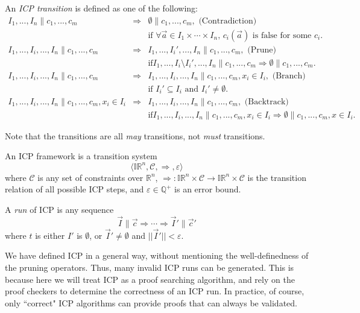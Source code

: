\documentclass[envcountsect]{llncs}
\begin{document}
\begin{definition}
An {\em ICP transition} is defined as one of the following:
\begin{eqnarray*}
I_1,...,I_n \parallel c_1, ..., c_m &\Longrightarrow&  \emptyset\parallel
c_1,...,c_m,
\mbox{ (Contradiction) }\\ & &\mbox{if $\forall \vec a\in
I_1\times\cdots\times I_n$, $c_i(\vec a)$ is false for some $c_i$.}\\
I_1,...,I_i,...,I_n \parallel c_1,...,c_m &\Longrightarrow&
I_1,...,I_i',...,I_n\parallel c_1,...,c_m, \mbox{ (Prune) }\\& & \mbox{if
$I_1,...,I_i\setminus I_i',...,I_n\parallel c_1,...,c_m\Longrightarrow
\emptyset \parallel c_1,...,c_m$.}\\
I_1,...,I_i,...,I_n \parallel c_1,...,c_m &\Longrightarrow&
I_1,...,I_i,...,I_n \parallel c_1,...,c_m, x_i\in I_i, \mbox{ (Branch) }\\&
&\mbox{if $I_i'\subseteq I_i$ and $I_i' \neq \emptyset$.}\\
I_1,...,I_i,...,I_n \parallel c_1,...,c_m, x_i\in I_i &\Longrightarrow&
I_1,...,I_i,...,I_n \parallel c_1,...,c_m,\mbox{ (Backtrack) }\\& & \mbox{if
$I_1,...,I_i,...,I_n\parallel c_1,...,c_m, x_i\in I_i \Longrightarrow
\emptyset\parallel c_1,...,c_m, x\in I_i$.}
\end{eqnarray*}
\end{definition}
Note that the transitions are all {\em may} transitions, not {\em must}
transitions. 
\begin{definition}
An ICP framework is a transition system 
$$\langle \mathbb{IR}^n, \mathcal{C}, \Longrightarrow, \varepsilon\rangle$$
where $\mathcal{C}$ is any set of constraints over $\mathbb{R}^n$,
$\Longrightarrow: \mathbb{IR}^n\times
\mathcal{C}\rightarrow \mathbb{IR}^n\times \mathcal{C}$ is the transition
relation of all possible ICP steps, and $\varepsilon\in \mathbb{Q}^+$ is an
error bound. 

A {\em run} of ICP is any sequence
$$\vec I \parallel \vec c \Longrightarrow \cdots \Longrightarrow \vec
I'\parallel \vec c'$$
where $t$ is either $I'$ is $\emptyset$, or $\vec I'\neq \emptyset$ and $||\vec
I'||<\varepsilon$.
\end{definition}
\begin{remark}
We have defined ICP in a general way, without mentioning the well-definedness of
the pruning operators. Thus, many invalid ICP runs can be generated. This is
because here we will treat ICP as a proof searching algorithm, and rely on the
proof checkers to determine the correctness of an ICP run. In practice, of
course, only
``correct" ICP algorithms can provide proofs that can always be validated.    
\end{remark}
\end{document}
